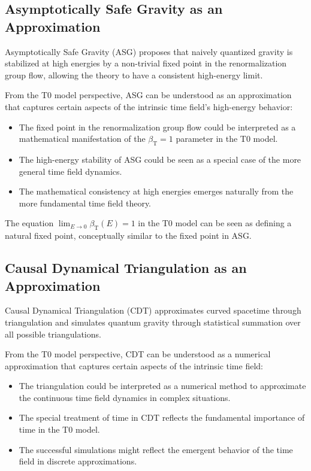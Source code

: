 \documentclass[12pt,a4paper]{article}
\newcommand{\betaT}{\beta_{\text{T}}}
\begin{document}
	\subsection{Asymptotically Safe Gravity as an Approximation}
	\label{subsec:asg}
	
	Asymptotically Safe Gravity (ASG) proposes that naively quantized gravity is stabilized at high energies by a non-trivial fixed point in the renormalization group flow, allowing the theory to have a consistent high-energy limit.
	
	From the T0 model perspective, ASG can be understood as an approximation that captures certain aspects of the intrinsic time field's high-energy behavior:
	
	\begin{itemize}
		\item The fixed point in the renormalization group flow could be interpreted as a mathematical manifestation of the $\betaT = 1$ parameter in the T0 model.
		
		\item The high-energy stability of ASG could be seen as a special case of the more general time field dynamics.
		
		\item The mathematical consistency at high energies emerges naturally from the more fundamental time field theory.
	\end{itemize}
	
	The equation $\lim_{E \to 0} \betaT(E) = 1$ in the T0 model \cite{pascher_alphabeta_2025} can be seen as defining a natural fixed point, conceptually similar to the fixed point in ASG.
	
	\subsection{Causal Dynamical Triangulation as an Approximation}
	\label{subsec:cdt}
	
	Causal Dynamical Triangulation (CDT) approximates curved spacetime through triangulation and simulates quantum gravity through statistical summation over all possible triangulations.
	
	From the T0 model perspective, CDT can be understood as a numerical approximation that captures certain aspects of the intrinsic time field:
	
	\begin{itemize}
		\item The triangulation could be interpreted as a numerical method to approximate the continuous time field dynamics in complex situations.
		
		\item The special treatment of time in CDT reflects the fundamental importance of time in the T0 model.
		
		\item The successful simulations might reflect the emergent behavior of the time field in discrete approximations.
	\end{itemize}
	
\end{document}
